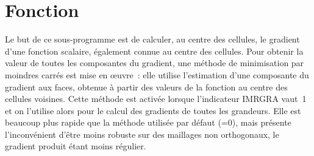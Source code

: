 %
%
%
%
%
%
%
%


\vspace{1cm}
\section{Fonction}
Le but de ce sous-programme est de calculer, au centre des cellules, le gradient
d'une fonction scalaire, \'egalement connue au centre des cellules.
Pour obtenir la valeur de toutes les composantes du gradient, une m\'ethode de
minimisation par moindres carr\'es est mise en
\oe uvre~: elle utilise l'estimation d'une composante du gradient aux faces,
obtenue \`a partir des
valeurs de la fonction au centre des cellules voisines. Cette m\'ethode est
activ\'ee lorsque l'indicateur IMRGRA vaut~1 et on l'utilise alors pour le calcul
des gradients de toutes les grandeurs. Elle est beaucoup plus rapide que la m\'ethode
utilis\'ee par d\'efaut (=0), mais pr\'esente l'inconv\'enient
d'\^etre moins robuste
sur des maillages non orthogonaux, le gradient produit \'etant moins r\'egulier.


